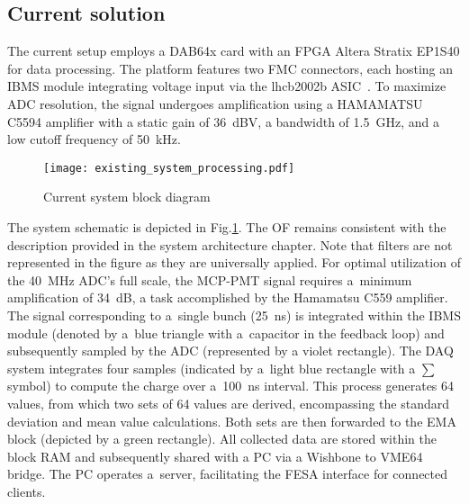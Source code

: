 \subsection{Current solution}
The current setup employs a DAB64x card with an FPGA Altera Stratix EP1S40 for
data processing. The platform features two FMC connectors, each hosting an IBMS
module integrating voltage input via the lhcb2002b ASIC~\cite{lhcb_asic}. To
maximize ADC resolution, the signal undergoes amplification using a HAMAMATSU
C5594 amplifier with a static gain of \SI{36}{dBV}, a bandwidth of
\SI{1.5}{GHz}, and a low cutoff frequency of \SI{50}{kHz}.
\begin{figure}[!tbh]
    \centering
    \texttt{[image: existing\_system\_processing.pdf]}
    \caption{Current system block diagram}
    \label{fig:current_system_processing}
\end{figure}
The system schematic is depicted in Fig.\ref{fig:current_system_processing}.
The OF remains consistent with the description provided
in the system architecture chapter. Note that filters are not represented in the
figure as they are universally applied. For optimal utilization of the \SI{40}{MHz}
ADC's full scale, the MCP-PMT signal requires a~minimum amplification of
\SI{34}{dB}, a task accomplished by the Hamamatsu C559
amplifier\cite{bsra_first_operation}.\\
The signal corresponding to a~single bunch (\SI{25}{ns})
is integrated within the IBMS module (denoted by a~blue triangle with a~capacitor in the feedback loop) and subsequently sampled by the ADC
(represented by a violet rectangle). The DAQ system integrates four samples
(indicated by a~light blue rectangle with a $\sum$ symbol) to compute the
charge over a~\SI{100}{ns} interval. This process generates 64 values, from
which two sets of 64 values are derived, encompassing the standard deviation
and mean value calculations. Both sets are then forwarded to the EMA block (depicted by a green rectangle). All collected data
are stored within the block RAM and subsequently shared with a PC via a
Wishbone to VME64 bridge. The PC operates a~server, facilitating the FESA
interface for connected clients.

